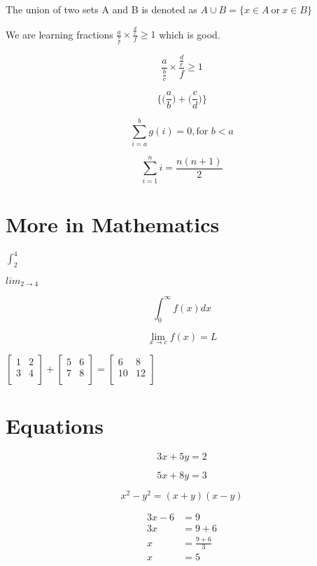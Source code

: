 \documentclass{article}
\begin{document}
    The union of two sets A and B is denoted as 
    $ A \cup B = \{ x \in A \ \text{or} \ x \in B \} $
    
    We are learning fractions $ \frac{a}{\frac{b}{c}} \times \frac{\frac{d}{e}}{f} \geq 1$ which is good.

    \[ \frac{a}{\frac{b}{c}} \times \frac{\frac{d}{e}}{f} \geq 1\]

    \[ \Bigg\{ \bigg(\frac{a}{b}\bigg) + \bigg(\frac{c}{d}\bigg)\Bigg\} \]

    \[ \sum_{i=a}^{b} g(i) = 0, \text{for } b < a \]

    \[ \sum_{i=1}^{n} i = \frac{n(n+1)}{2} \]

    \section{More in Mathematics}

    $\int_{2}^{4}$

    $lim_{2 \to 4}$

    \[ \int_{0}^{\infty} f(x)dx \]

    \[ \lim_{x \to c} f(x)=L \]

    $
    \begin{bmatrix}
        1 & 2 \\
        3 & 4 \\
    \end{bmatrix}
    +
    \begin{bmatrix}
        5 & 6 \\
        7 & 8 \\
    \end{bmatrix}
    =
    \begin{bmatrix}
        6 & 8 \\
        10 & 12 \\
    \end{bmatrix}
    $

    \section{Equations}
    \begin{equation}
        3x + 5y = 2
    \end{equation}
    
    \begin{equation}
        5x + 8y = 3
    \end{equation}

    \begin{equation}
        x^{2} - y^{2} = (x+y)(x-y)
    \end{equation}

    \begin{align}
        3x - 6 &= 9 \\
        3x &= 9 + 6 \nonumber \\
        x &= \frac{9+6}{3} \nonumber \\
        x &= 5 \nonumber
    \end{align}
\end{document}

